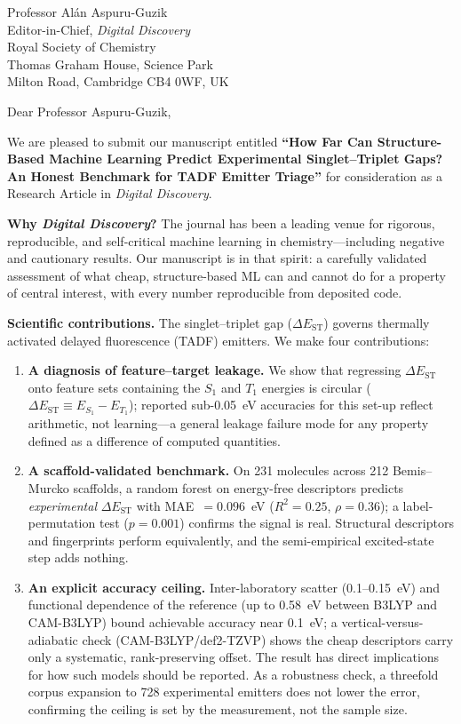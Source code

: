 \documentclass[12pt,a4paper]{letter}
\date{June 27, 2026}
\begin{document}
\begin{letter}{
  Professor Alán Aspuru-Guzik\\
  Editor-in-Chief, \textit{Digital Discovery}\\
  Royal Society of Chemistry\\
  Thomas Graham House, Science Park\\
  Milton Road, Cambridge CB4 0WF, UK
}

\opening{Dear Professor Aspuru-Guzik,}

We are pleased to submit our manuscript entitled \textbf{``How Far Can
Structure-Based Machine Learning Predict Experimental Singlet--Triplet Gaps?
An Honest Benchmark for TADF Emitter Triage''} for consideration as a Research
Article in \textit{Digital Discovery}.

\textbf{Why \textit{Digital Discovery}?}
The journal has been a leading venue for rigorous, reproducible, and
self-critical machine learning in chemistry---including negative and
cautionary results. Our manuscript is in that spirit: a carefully validated
assessment of what cheap, structure-based ML can and cannot do for a property
of central interest, with every number reproducible from deposited code.

\textbf{Scientific contributions.}
The singlet--triplet gap ($\Delta E_\text{ST}$) governs thermally activated
delayed fluorescence (TADF) emitters. We make four contributions:

\begin{enumerate}
  \item \textbf{A diagnosis of feature--target leakage.} We show that regressing
  $\Delta E_\text{ST}$ onto feature sets containing the $S_1$ and $T_1$
  energies is circular ($\Delta E_\text{ST}\equiv E_{S_1}-E_{T_1}$); reported
  sub-\num{0.05}~eV accuracies for this set-up reflect arithmetic, not learning---a
  general leakage failure mode for any property defined as a difference of computed
  quantities.

  \item \textbf{A scaffold-validated benchmark.} On \num{231} molecules across
  \num{212} Bemis--Murcko scaffolds, a random forest on energy-free descriptors
  predicts \emph{experimental} $\Delta E_\text{ST}$ with MAE~$= 0.096$~eV
  ($R^2 = 0.25$, $\rho = 0.36$); a label-permutation test ($p = 0.001$) confirms the
  signal is real. Structural descriptors and fingerprints perform equivalently, and
  the semi-empirical excited-state step adds nothing.

  \item \textbf{An explicit accuracy ceiling.} Inter-laboratory scatter
  (\num{0.1}--\num{0.15}~eV) and functional dependence of the reference (up to
  \num{0.58}~eV between B3LYP and CAM-B3LYP) bound achievable accuracy near
  \num{0.1}~eV; a vertical-versus-adiabatic check (CAM-B3LYP/def2-TZVP) shows the
  cheap descriptors carry only a systematic, rank-preserving offset. The result has
  direct implications for how such models should be reported. As a robustness check, a
  threefold corpus expansion to \num{728} experimental emitters does not lower the error,
  confirming the ceiling is set by the measurement, not the sample size.


\end{enumerate}
\end{letter}
\end{document}
